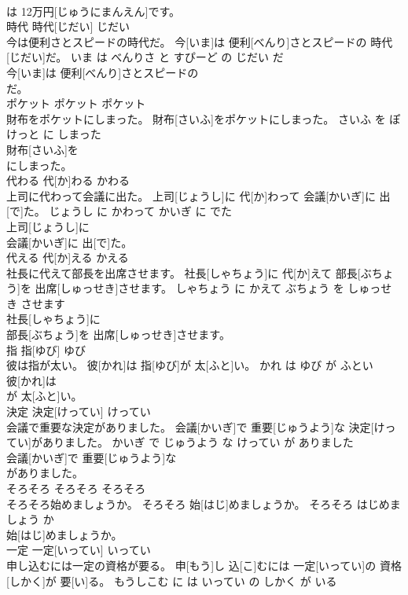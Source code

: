 \documentclass[8pt]{extreport}
\begin{document}
\begin{CJK}{UTF8}{min}
\\	は 12万円[じゅうにまんえん]です。			
\\	時代	時代[じだい]	じだい	
\\	今は便利さとスピードの時代だ。	今[いま]は 便利[べんり]さとスピードの 時代[じだい]だ。	いま は べんりさ と すぴーど の じだい だ	
\\	今[いま]は 便利[べんり]さとスピードの
\\	だ。			
\\	ポケット	ポケット	ポケット	
\\	財布をポケットにしまった。	財布[さいふ]をポケットにしまった。	さいふ を ぽけっと に しまった	
\\	財布[さいふ]を
\\	にしまった。			
\\	代わる	代[か]わる	かわる	
\\	上司に代わって会議に出た。	上司[じょうし]に 代[か]わって 会議[かいぎ]に 出[で]た。	じょうし に かわって かいぎ に でた	
\\	上司[じょうし]に
\\	会議[かいぎ]に 出[で]た。			
\\	代える	代[か]える	かえる	
\\	社長に代えて部長を出席させます。	社長[しゃちょう]に 代[か]えて 部長[ぶちょう]を 出席[しゅっせき]させます。	しゃちょう に かえて ぶちょう を しゅっせき させます	
\\	社長[しゃちょう]に
\\	部長[ぶちょう]を 出席[しゅっせき]させます。			
\\	指	指[ゆび]	ゆび	
\\	彼は指が太い。	彼[かれ]は 指[ゆび]が 太[ふと]い。	かれ は ゆび が ふとい	
\\	彼[かれ]は
\\	が 太[ふと]い。			
\\	決定	決定[けってい]	けってい	
\\	会議で重要な決定がありました。	会議[かいぎ]で 重要[じゅうよう]な 決定[けってい]がありました。	かいぎ で じゅうよう な けってい が ありました	
\\	会議[かいぎ]で 重要[じゅうよう]な
\\	がありました。			
\\	そろそろ	そろそろ	そろそろ	
\\	そろそろ始めましょうか。	そろそろ 始[はじ]めましょうか。	そろそろ はじめましょう か	
\\	始[はじ]めましょうか。			
\\	一定	一定[いってい]	いってい	
\\	申し込むには一定の資格が要る。	申[もう]し 込[こ]むには 一定[いってい]の 資格[しかく]が 要[い]る。	もうしこむ に は いってい の しかく が いる	

\end{CJK}
\end{document}
